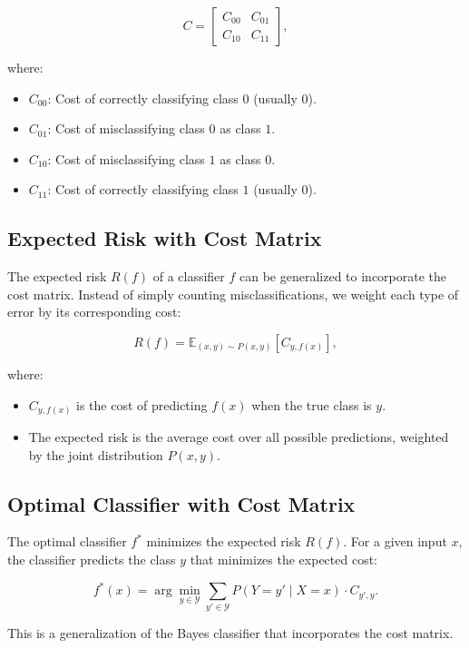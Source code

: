 \begin{notechapter}
\[
C = \begin{bmatrix}
C_{00} & C_{01} \\
C_{10} & C_{11}
\end{bmatrix},
\]

where:
\begin{itemize}
    \item \( C_{00} \): Cost of correctly classifying class \( 0 \) (usually \( 0 \)).
    \item \( C_{01} \): Cost of misclassifying class \( 0 \) as class \( 1 \).
    \item \( C_{10} \): Cost of misclassifying class \( 1 \) as class \( 0 \).
    \item \( C_{11} \): Cost of correctly classifying class \( 1 \) (usually \( 0 \)).
\end{itemize}

\subsection{Expected Risk with Cost Matrix}
The expected risk \( R(f) \) of a classifier \( f \) can be generalized to incorporate the cost matrix. Instead of simply counting misclassifications, we weight each type of error by its corresponding cost:

\[
R(f) = \mathbb{E}_{(x,y) \sim P(x,y)}[C_{y, f(x)}],
\]

where:
\begin{itemize}
    \item \( C_{y, f(x)} \) is the cost of predicting \( f(x) \) when the true class is \( y \).
    \item The expected risk is the average cost over all possible predictions, weighted by the joint distribution \( P(x, y) \).
\end{itemize}

\subsection{Optimal Classifier with Cost Matrix}
The optimal classifier \( f^* \) minimizes the expected risk \( R(f) \). For a given input \( x \), the classifier predicts the class \( y \) that minimizes the expected cost:

\[
f^*(x) = \arg\min_{y \in \mathcal{Y}} \sum_{y' \in \mathcal{Y}} P(Y = y' \mid X = x) \cdot C_{y', y}.
\]

This is a generalization of the Bayes classifier that incorporates the cost matrix.


\end{notechapter}
